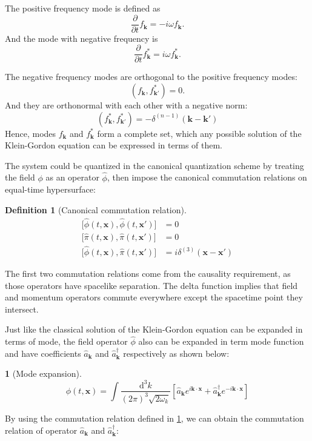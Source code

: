 \documentclass[12pt]{article}
\numberwithin{equation}{section}
\theoremstyle{1style}
\newtheorem{definition}[equation]{Definition}
\newtheorem{cthm}[equation]{}
\newcommand{\p}{\partial}
\newcommand{\id}{\mathrm{d}}
\begin{document}
The positive frequency mode is defined as \[\frac{\p}{\p t}f_{\mathbf{k}}=-i\omega f_{\mathbf{k}}.\]
And the mode with negative frequency is \[\frac{\p}{\p t}f^*_{\mathbf{k}}=i\omega f^*_{\mathbf{k}}.\]

The negative frequency modes are orthogonal to the positive frequency modes:
\begin{equation}
  \left(f_{\mathbf{k}},f^*_{\mathbf{k}'}\right)=0.
\end{equation}
And they are orthonormal with each other with a negative norm:
\begin{equation}
  \left(f^*_{\mathbf{k}},f^*_{\mathbf{k}'}\right)=-\delta^{(n-1)}(\mathbf{k}-\mathbf{k'})
\end{equation}
Hence, modes \(f_{\mathbf{k}}\) and \(f^*_{\mathbf{k}}\) form a complete set, which any possible solution
of the Klein-Gordon equation can be expressed in terms of them.
\bigskip

The system could be quantized in the canonical quantization scheme by treating the field \(\phi\) as an operator \(\hat{\phi}\),
then impose the canonical commutation relations on equal-time hypersurface:
\begin{definition}[Canonical commutation relation]\label{121}
  \begin{align*}
    \bigl[\hat{\phi}(t,\mathbf{x}),\hat{\phi}(t,\mathbf{x'})\bigr] & =0                                       \\
    \bigl[\hat{\pi}(t,\mathbf{x}),\hat{\pi}(t,\mathbf{x'})\bigr]   & =0                                       \\
    \bigl[\hat{\phi}(t,\mathbf{x}),\hat{\pi}(t,\mathbf{x'})\bigr]  & =i\delta^{(3)}(\mathbf{x}-\mathbf{x'})
  \end{align*}
\end{definition}
The first two commutation relations come from the causality requirement, as those operators have spacelike separation.
The delta function implies that field and momentum operators commute everywhere except the spacetime point they intersect.

Just like the classical solution of the Klein-Gordon equation can be expanded in terms of mode,
the field operator \(\hat{\phi}\) also can be expanded in term mode function and have coefficients \(\hat{a}_{\mathbf{k}}\) and
\(\hat{a}^{\dagger}_{\mathbf{k}}\) respectively as shown below:
\begin{cthm}[Mode expansion]
  \[\phi(t,\mathbf{x})=\int\frac{\id^{3}k}{(2\pi)^3\sqrt{2\omega_{k}}}\left[\hat{a}_{\mathbf{k}}e^{i\mathbf{k}\cdot \mathbf{x}}+
    \hat{a}^{\dagger}_{\mathbf{k}}e^{-i\mathbf{k}\cdot \mathbf{x}}\right]\]
\end{cthm}
By using the commutation relation defined in \ref{121}, we can obtain the commutation relation of operator \(\hat{a}_{\mathbf{k}}\) and
\(\hat{a}^{\dagger}_{\mathbf{k}}\):
\end{document}
